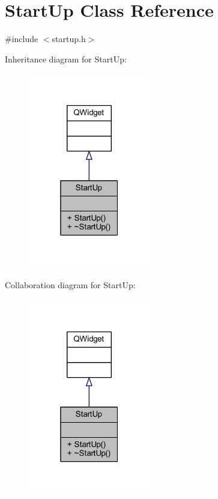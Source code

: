 \hypertarget{class_start_up}{}\section{Start\+Up Class Reference}
\label{class_start_up}


{\ttfamily \#include $<$startup.\+h$>$}



Inheritance diagram for Start\+Up\+:\nopagebreak
\begin{figure}[H]
\begin{center}
\leavevmode
\includegraphics[width=151pt]{class_start_up__inherit__graph}
\end{center}
\end{figure}


Collaboration diagram for Start\+Up\+:\nopagebreak
\begin{figure}[H]
\begin{center}
\leavevmode
\includegraphics[width=151pt]{class_start_up__coll__graph}
\end{center}
\end{figure}
